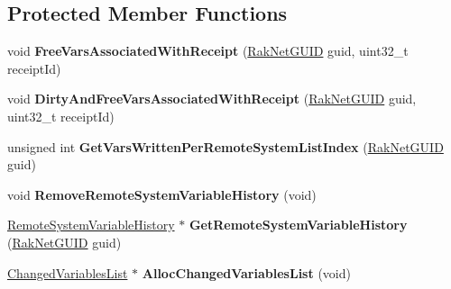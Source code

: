\subsection*{Protected Member Functions}
\begin{DoxyCompactItemize}
\item 
\hypertarget{class_rak_net_1_1_variable_delta_serializer_a238dc1ef069b33be079c7aafef66c6c7}{void {\bfseries Free\-Vars\-Associated\-With\-Receipt} (\hyperlink{struct_rak_net_1_1_rak_net_g_u_i_d}{Rak\-Net\-G\-U\-I\-D} guid, uint32\-\_\-t receipt\-Id)}\label{class_rak_net_1_1_variable_delta_serializer_a238dc1ef069b33be079c7aafef66c6c7}

\item 
\hypertarget{class_rak_net_1_1_variable_delta_serializer_aa063fbd31b6292cd64d36a5fa172c315}{void {\bfseries Dirty\-And\-Free\-Vars\-Associated\-With\-Receipt} (\hyperlink{struct_rak_net_1_1_rak_net_g_u_i_d}{Rak\-Net\-G\-U\-I\-D} guid, uint32\-\_\-t receipt\-Id)}\label{class_rak_net_1_1_variable_delta_serializer_aa063fbd31b6292cd64d36a5fa172c315}

\item 
\hypertarget{class_rak_net_1_1_variable_delta_serializer_affae641077b786c77cf5373abf824207}{unsigned int {\bfseries Get\-Vars\-Written\-Per\-Remote\-System\-List\-Index} (\hyperlink{struct_rak_net_1_1_rak_net_g_u_i_d}{Rak\-Net\-G\-U\-I\-D} guid)}\label{class_rak_net_1_1_variable_delta_serializer_affae641077b786c77cf5373abf824207}

\item 
\hypertarget{class_rak_net_1_1_variable_delta_serializer_a2a606cdd6f5dbc37bd153b0f8dc20ce3}{void {\bfseries Remove\-Remote\-System\-Variable\-History} (void)}\label{class_rak_net_1_1_variable_delta_serializer_a2a606cdd6f5dbc37bd153b0f8dc20ce3}

\item 
\hypertarget{class_rak_net_1_1_variable_delta_serializer_a0a9316f258d4c360be4e31207b2f1442}{\hyperlink{struct_rak_net_1_1_variable_delta_serializer_1_1_remote_system_variable_history}{Remote\-System\-Variable\-History} $\ast$ {\bfseries Get\-Remote\-System\-Variable\-History} (\hyperlink{struct_rak_net_1_1_rak_net_g_u_i_d}{Rak\-Net\-G\-U\-I\-D} guid)}\label{class_rak_net_1_1_variable_delta_serializer_a0a9316f258d4c360be4e31207b2f1442}

\item 
\hypertarget{class_rak_net_1_1_variable_delta_serializer_a85572881fd34c2a7bf010dfd54fb19e6}{\hyperlink{struct_rak_net_1_1_variable_delta_serializer_1_1_changed_variables_list}{Changed\-Variables\-List} $\ast$ {\bfseries Alloc\-Changed\-Variables\-List} (void)}\label{class_rak_net_1_1_variable_delta_serializer_a85572881fd34c2a7bf010dfd54fb19e6}


\end{DoxyCompactItemize}
